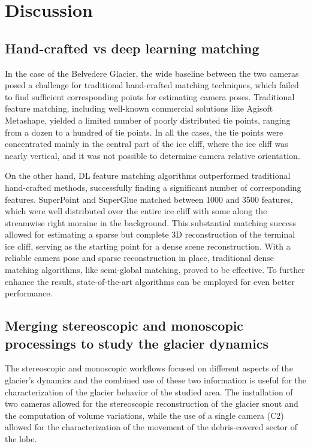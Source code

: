 \section{Discussion}
\label{sec:4:discussion}

\subsection{Hand-crafted vs deep learning matching}\label{sec:4:handcrafted_vs_dl}

In the case of the Belvedere Glacier, the wide baseline between the two cameras posed a
challenge for traditional hand-crafted matching techniques, which failed to find
sufficient corresponding points for estimating camera poses.
Traditional feature matching, including well-known commercial solutions like
Agisoft Metashape, yielded a limited number of poorly distributed tie points, ranging
from a dozen to a hundred of tie points.
In all the cases, the tie points were concentrated mainly in the central part of the ice
cliff, where the ice cliff was nearly vertical, and it was not possible to determine
camera relative orientation.

On the other hand, DL feature matching algorithms outperformed traditional hand-crafted
methods, successfully finding a significant number of corresponding features.
SuperPoint and SuperGlue matched between 1000 and 3500 features, which were
well distributed over the entire ice cliff with some along the streamwise right moraine
in the background.
This substantial matching success allowed for estimating a sparse but complete 3D
reconstruction of the terminal ice cliff, serving as the starting point for a
dense scene reconstruction.
With a reliable camera pose and sparse reconstruction in place, traditional dense
matching algorithms, like semi-global matching, proved to be effective.
To further enhance the result, state-of-the-art algorithms can be employed for
even better performance.

\subsection{Merging stereoscopic and monoscopic processings to study the glacier
  dynamics}\label{sec:4:stereo_monoscopic}

The stereoscopic and monoscopic workflows focused on different aspects of the glacier's
dynamics and the combined use of these two information is useful for the characterization
of the glacier behavior of the studied area.
The installation of two cameras allowed for the stereoscopic reconstruction of the
glacier snout and the computation of volume variations, while the use of a single camera
(C2) allowed for the characterization of the movement of the debris-covered sector of the
lobe.

